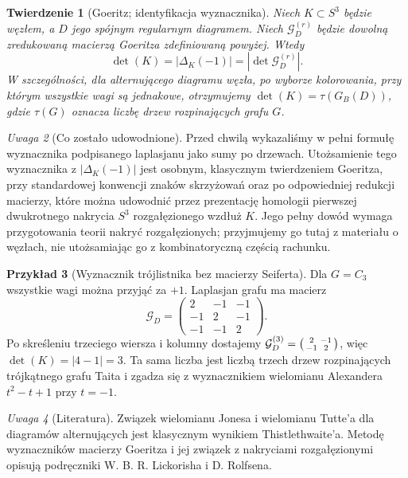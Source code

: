 \documentclass[11pt,a4paper]{report}
\numberwithin{equation}{section}
\theoremstyle{plain}
\newtheorem{twierdzenie}{Twierdzenie}[section]
\theoremstyle{definition}
\newtheorem{przyklad}[twierdzenie]{Przykład}
\theoremstyle{remark}
\newtheorem{uwaga}[twierdzenie]{Uwaga}
\begin{document}
\begin{twierdzenie}[Goeritz; identyfikacja wyznacznika]
Niech $K\subset S^3$ będzie węzłem, a $D$ jego
spójnym regularnym diagramem. Niech
$\mathcal G_D^{(r)}$ będzie dowolną zredukowaną
macierzą Goeritza zdefiniowaną powyżej. Wtedy
\[
\det(K)=|\Delta_K(-1)|=|\det\mathcal G_D^{(r)}|.
\]
W szczególności, dla alternującego diagramu węzła,
po wyborze kolorowania, przy którym wszystkie wagi
są jednakowe, otrzymujemy
$\det(K)=\tau(G_B(D))$, gdzie $\tau(G)$ oznacza
liczbę drzew rozpinających grafu $G$.
\end{twierdzenie}
\begin{uwaga}[Co zostało udowodnione]
Przed chwilą wykazaliśmy w pełni formułę wyznacznika
podpisanego laplasjanu jako sumy po drzewach.
Utożsamienie tego wyznacznika z $|\Delta_K(-1)|$
jest osobnym, klasycznym twierdzeniem Goeritza,
przy standardowej konwencji znaków skrzyżowań
oraz po odpowiedniej redukcji macierzy,
które można udowodnić przez prezentację homologii
pierwszej dwukrotnego nakrycia $S^3$ rozgałęzionego
wzdłuż $K$. Jego pełny dowód wymaga przygotowania
teorii nakryć rozgałęzionych; przyjmujemy go tutaj
z materiału o węzłach, nie utożsamiając go z
kombinatoryczną częścią rachunku.
\end{uwaga}

\begin{przyklad}[Wyznacznik trójlistnika bez macierzy Seiferta]
Dla $G=C_3$ wszystkie wagi można przyjąć za $+1$.
Laplasjan grafu ma macierz
\[
\mathcal G_D=\begin{pmatrix}
 2&-1&-1\\ -1&2&-1\\ -1&-1&2
\end{pmatrix}.
\]
Po skreśleniu trzeciego wiersza i kolumny dostajemy
$\mathcal G_D^{(3)}=\begin{psmallmatrix}2&-1\\-1&2\end{psmallmatrix}$,
więc $\det(K)=|4-1|=3$.
Ta sama liczba jest liczbą trzech drzew rozpinających
trójkątnego grafu Taita i zgadza się z wyznacznikiem
wielomianu Alexandera $t^2-t+1$ przy $t=-1$.
\end{przyklad}

\begin{uwaga}[Literatura]
Związek wielomianu Jonesa i wielomianu Tutte'a dla diagramów
alternujących jest klasycznym wynikiem Thistlethwaite'a.
Metodę wyznaczników macierzy Goeritza i jej związek z
nakryciami rozgałęzionymi opisują podręczniki
W. B. R. Lickorisha i D. Rolfsena.
\end{uwaga}
\end{document}
